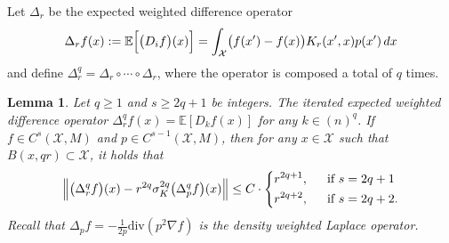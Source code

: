 \documentclass{article}
\newcommand{\1}{\mathbf{1}}
\newcommand{\Xset}{\mathcal{X}}
\newcommand{\Ebb}{\mathbb{E}}
\theoremstyle{alden}
\theoremstyle{aldenthm}
\newtheorem{lemma}{Lemma}
\theoremstyle{definition}
\theoremstyle{remark}
\begin{document}
Let $\Delta_r$ be the expected weighted difference operator
\begin{equation}
\Delta_rf(x) := \Ebb\Bigl[\bigl(D_if\bigr)(x)\Bigr] = \int_{\Xset} \bigl(f(x') - f(x)\bigr) K_r(x',x) p(x') \,dx
\end{equation}
and define $\Delta_r^q = \Delta_r \circ \cdots \circ \Delta_r$, where the operator is composed a total of $q$ times. 
\begin{lemma}
	\label{lem:expected_difference_holder}
	Let $q \geq 1$ and $s \geq 2q + 1$ be integers. The iterated expected weighted difference operator  $\Delta_r^qf(x) = \Ebb[D_kf(x)]$ for any $k \in (n)^q$. If $f \in C^s(\Xset,M)$ and $p \in C^{s-1}(\Xset,M)$, then for any $x \in \Xset$ such that $B(x,qr) \subset \Xset$, it holds that
	\begin{equation*}
	\Bigl\|\bigl(\Delta_r^qf\bigr)(x) - r^{2q} \sigma_K^{2q} \bigl(\Delta_{p}^qf\bigr)(x)\Bigr\| \leq C \cdot
	\begin{dcases}
	r^{2q + 1},& ~~\textrm{if $s = 2q + 1$} \\
	r^{2q + 2},& ~~\textrm{if $s = 2q + 2$.}
	\end{dcases}
	\end{equation*}
	Recall that $\Delta_pf = -\frac{1}{2p}\mathrm{div}(p^2 \nabla f)$ is the density weighted Laplace operator.
\end{lemma}
\end{document}
